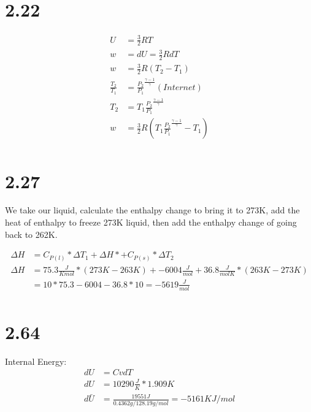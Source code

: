 \documentclass[10pt]{article} %
\begin{document}
\section{2.22}
\begin{align}
  U &= \frac{3}{2}RT\\
  w &= dU = \frac{3}{2}RdT\\
  w &= \frac{3}{2}R(T_2 - T_1)\\
  \frac{T_2}{T_1} &= \frac{P_2}{P_1}^\frac{\gamma - 1}{\gamma} (Internet)\\
  T_2 &= T_1\frac{P_2}{P_1}^\frac{\gamma - 1}{\gamma}\\
  w &= \frac{3}{2}R(T_1\frac{P_2}{P_1}^\frac{\gamma - 1}{\gamma} - T_1)\\
\end{align}

\section{2.27}

We take our liquid, calculate the enthalpy change to bring it to 273K, add the heat of enthalpy to freeze 273K liquid, then add the enthalpy change of going back to 262K.

\begin{align}
  \Delta H &= C_{P(l)} * \Delta T_1 + \Delta H* + C_{P(s)} * \Delta T_2\\
  \Delta H &= 75.3 \frac{J}{K mol} * (273K - 263K) + -6004 \frac{J}{mol} + 36.8 \frac{J}{mol K} * (263K - 273K)\\
   &= 10*75.3 - 6004 - 36.8*10 = -5619 \frac{J}{mol}\\
\end{align}


\section{2.64}



Internal Energy:
\begin{align}
  dU &= Cv dT\\
  dU &= 10290 \frac{J}{K} * 1.909K\\
  d\bar{U} &= \frac{19551J}{0.4362g / 128.19 g/mol} = -5161 KJ/mol\\
\end{align}
\end{document}
